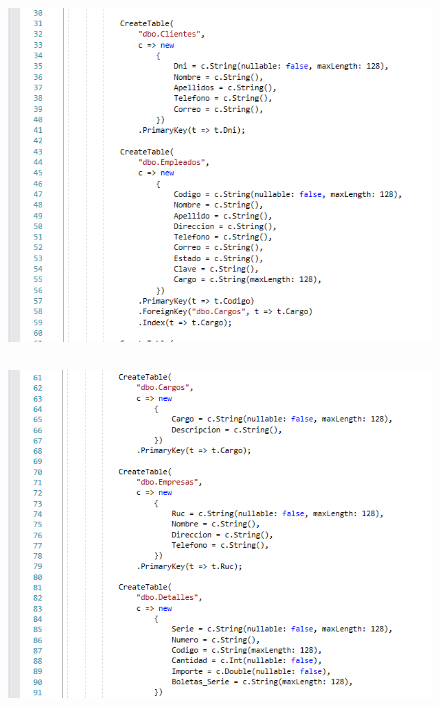 \documentclass[12pt,a4paper,oneside]{book}
\begin{document}
\begin{enumerate}
\begin{enumerate}
\begin{enumerate}
								\begin{figure}[htb]
									\centering \includegraphics[width=12cm, height=9cm]{img/Migraciones/5clasemigra.png}
								\end{figure}
					\newpage		
								\begin{figure}[htb]
									\centering \includegraphics[width=12cm, height=9cm]{img/Migraciones/6clasemigra.png}
								\end{figure}
							

\end{enumerate}
\end{enumerate}
\end{enumerate}
\end{document}
